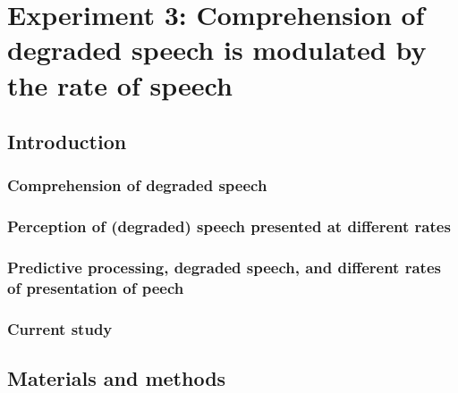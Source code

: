 \documentclass[a4paper, nobind]{templates/ociamthesis}
\begin{document}
\hypertarget{experiment-3-comprehension-of-degraded-speech-is-modulated-by-the-rate-of-speech}{%
\chapter{Experiment 3: Comprehension of degraded speech is modulated by the rate of speech}\label{experiment-3-comprehension-of-degraded-speech-is-modulated-by-the-rate-of-speech}}

\minitoc

\hypertarget{introduction-1}{%
\section{Introduction}\label{introduction-1}}

\hypertarget{comprehension-of-degraded-speech-1}{%
\subsection{Comprehension of degraded speech}\label{comprehension-of-degraded-speech-1}}

\hypertarget{perception-of-degraded-speech-presented-at-different-rates}{%
\subsection{Perception of (degraded) speech presented at different rates}\label{perception-of-degraded-speech-presented-at-different-rates}}

\hypertarget{predictive-processing-degraded-speech-and-different-rates-of-presentation-of-peech}{%
\subsection{Predictive processing, degraded speech, and different rates of presentation of peech}\label{predictive-processing-degraded-speech-and-different-rates-of-presentation-of-peech}}

\hypertarget{current-study}{%
\subsection{Current study}\label{current-study}}

\hypertarget{materials-and-methods}{%
\section{Materials and methods}\label{materials-and-methods}}
\end{document}
